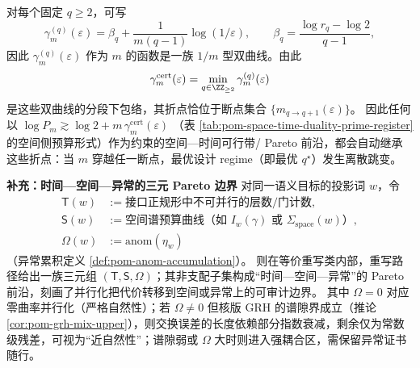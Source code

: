 \begin{remark}
\begin{enumerate}
  对每个固定 \(q\ge 2\)，可写
  \[
  \gamma^{(q)}_m(\varepsilon)=\beta_q+\frac{1}{m(q-1)}\log(1/\varepsilon),
  \qquad
  \beta_q=\frac{\log r_q-\log 2}{q-1},
  \]
  因此 \(\gamma^{(q)}_m(\varepsilon)\) 作为 \(m\) 的函数是一族 \(1/m\) 型双曲线。由此
  \[
  \gamma^{\mathrm{cert}}_m(\varepsilon)=\min_{q\in\ZZ_{\ge 2}}\gamma^{(q)}_m(\varepsilon)
  \]
  是这些双曲线的分段下包络，其折点恰位于断点集合 \(\{m_{q\to q+1}(\varepsilon)\}\)。
  因此任何以
  \(
  \log P_m\gtrsim \log 2+m\,\gamma^{\mathrm{cert}}_m(\varepsilon)
  \)
  （表 \ref{tab:pom-space-time-duality-prime-register} 的空间侧预算形式）作为约束的空间—时间可行带/ Pareto 前沿，都会自动继承这些折点：当 \(m\) 穿越任一断点，最优设计 regime（即最优 \(q^\star\)）发生离散跳变。
\end{enumerate}
\end{remark}



\begin{remark}\label{rem:pom-pareto-ts-omega}
\medskip\noindent\textbf{补充：时间—空间—异常的三元 Pareto 边界}
对同一语义目标的投影词 \(w\)，令
\[
\begin{aligned}
\mathsf T(w)&:=\text{接口正规形中不可并行的层数/门计数},\\
\mathsf S(w)&:=\text{空间谱预算曲线（如 }I_w(\gamma)\text{ 或 }\Sigma_{\mathrm{space}}(w)\text{）},\\
\Omega(w)&:=\mathrm{anom}(\eta_w)
\end{aligned}
\]
（异常累积定义 \ref{def:pom-anom-accumulation}）。
则在等价重写类内部，重写路径给出一族三元组 \((\mathsf T,\mathsf S,\Omega)\)；其非支配子集构成“时间—空间—异常”的 Pareto 前沿，刻画了并行化把代价转移到空间或异常上的可审计边界。
其中 \(\Omega=0\) 对应零曲率并行化（严格自然性）；若 \(\Omega\neq 0\) 但核版 GRH 的谱隙界成立（推论 \ref{cor:pom-grh-mix-upper}），则交换误差的长度依赖部分指数衰减，剩余仅为常数级残差，可视为“近自然性”；谱隙弱或 \(\Omega\) 大时则进入强耦合区，需保留异常证书随行。
\end{remark}

